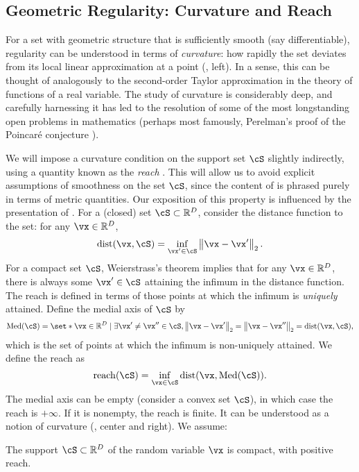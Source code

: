 \documentclass[../../book-main.tex]{subfiles}
\begin{document}
\subsection{Geometric Regularity: Curvature and Reach}

For a set with geometric structure that is sufficiently smooth (say
differentiable), regularity can be understood in terms of \textit{curvature}:
how rapidly the set deviates from its local linear approximation at a point
(, left). In
a sense, this can be thought of analogously to the second-order Taylor
approximation in the theory of functions of a real variable.
The study of curvature is considerably deep, and carefully harnessing it has led
to the resolution of some of the most longstanding open problems in mathematics
(perhaps most famously, Perelman's proof of the Poincar\'{e} conjecture
\cite{Perelman2002-bt,Perelman2003-xe,Perelman2003-yk}).

We will impose a curvature condition on the support set $\cS$ slightly
indirectly, using a quantity known as the \textit{reach} \cite{Federer1959-gk}.
This will allow us to avoid explicit assumptions of smoothness on the set $\cS$,
since the content of  is phrased
purely in terms of metric quantities.
Our exposition of this property is influenced by the presentation of
\textcite{Aamari2019-mp}. For a (closed) set $\cS \subset \R^D$, consider the
distance function to the set: for any $\vx \in \R^D$,
\begin{equation}\label{eq:dist-func}
    \dist(\vx, \cS) = \inf_{\vx' \in \cS} \norm*{\vx - \vx'}_2.
\end{equation}
For a compact set $\cS$, Weierstrass's theorem implies that for any $\vx \in
\R^D$, there is always some $\vx' \in \cS$ attaining the infimum in the distance
function. The reach is defined in terms of those points at which the infimum is
\textit{uniquely} attained. Define the medial axis of $\cS$ by
\begin{equation}
    \mathrm{Med}(\cS) = \set*{
        \vx \in \R^D \given \exists \vx' \neq \vx'' \in \cS,
        \norm*{\vx - \vx'}_2 = \norm*{\vx - \vx''}_2 = \dist(\vx, \cS)
    },
\end{equation}
which is the set of points at which the infimum is non-uniquely attained.
We define the reach as
\begin{equation}
    \mathrm{reach}(\cS) = \inf_{\vx \in \cS} \dist(\vx, \mathrm{Med}(\cS)).
\end{equation}
The medial axis can be empty (consider a convex set $\cS$), in which case the
reach is $+\infty$. If it is nonempty, the reach is finite. It can be understood
as a notion of curvature (, center and right).
We assume:
\begin{assumption}\label{assumption:positive-reach}
    The support $\cS \subset \R^D$ of the random variable $\vx$ is compact,
    with positive reach.
\end{assumption}
\end{document}
